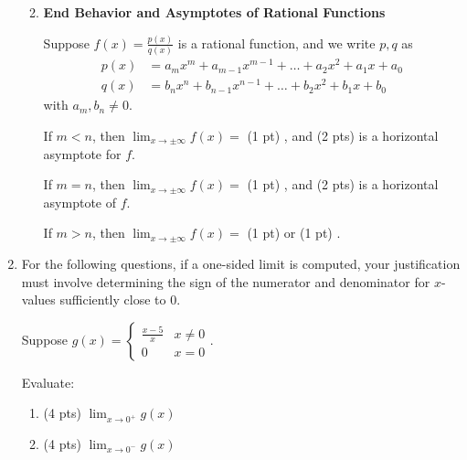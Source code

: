 \documentclass[11pt,letterpaper]{article}
\begin{document}
\begin{enumerate}
\begin{enumerate}
\newpage
\item {\bf End Behavior and Asymptotes of Rational Functions}

Suppose $f(x)=\frac{p(x)}{q(x)}$ is a rational function, and we write $p,q$ as
\begin{align*}p(x) & =a_mx^m+a_{m-1}x^{m-1}+\dots+a_2x^2+a_1x+a_0 \\
q(x) &=b_nx^n+b_{n-1}x^{n-1}+\dots+b_2x^2+b_1x+b_0
\end{align*}
with $a_m,b_n\neq 0$.

\vspace{1pc}
If $m<n$, then $\lim_{x\to\pm\infty}f(x)=$ (1 pt) \underline{\hspace{20ex}}, and (2 pts) \underline{\hspace{20ex}} is a horizontal asymptote for $f$.

\vspace{1pc}
If $m=n$, then $\lim_{x\to\pm\infty}f(x)=$  (1 pt) \underline{\hspace{20ex}}, and (2 pts) \underline{\hspace{20ex}} is a horizontal asymptote of $f$.

\vspace{1pc}
If $m>n$, then $\lim_{x\to\pm\infty}f(x)=$ (1 pt) \underline{\hspace{20ex}} or (1 pt) \underline{\hspace{20ex}}.

\end{enumerate}

\vspace{5pc}
\item For the following questions, if a one-sided limit is computed, your justification must involve determining the sign of the numerator and denominator for $x$-values sufficiently close to 0.

\begin{center}Suppose $g(x)=\begin{cases}\frac{x-5}{x} & x\neq 0 \\
	0 & x=0 \end{cases}$.\end{center}
	
Evaluate: 
\begin{enumerate}
\item (4 pts) $\lim_{x\to 0^+}g(x)$  

\vspace{5pc}
\item (4 pts) $\lim_{x\to 0^-}g(x)$  


\end{enumerate}
\end{enumerate}
\end{document}
